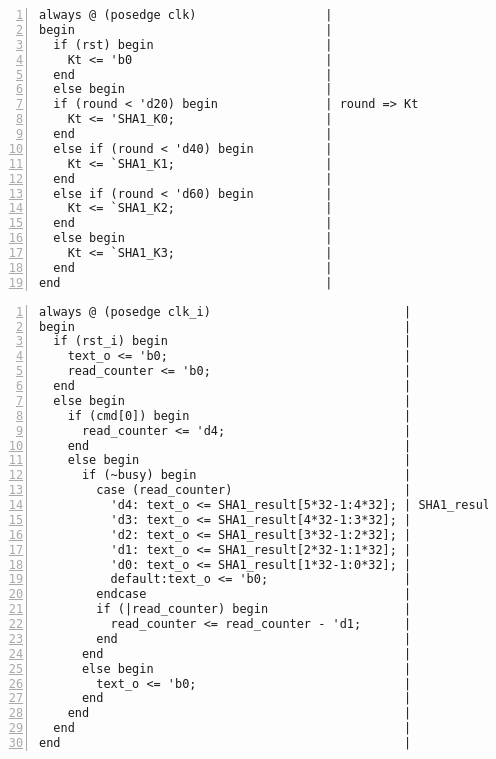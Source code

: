 \begin{Verbatim}[frame=single, numbers=left, tabsize=4, label=Kt generator]
always @ (posedge clk)                  |
begin                                   |
  if (rst) begin                        |
    Kt <= 'b0                           |
  end                                   |
  else begin                            |
  if (round < 'd20) begin               | round => Kt
    Kt <= 'SHA1_K0;                     |
  end                                   |
  else if (round < 'd40) begin          |
    Kt <= `SHA1_K1;                     |
  end                                   |
  else if (round < 'd60) begin          |
    Kt <= `SHA1_K2;                     |
  end                                   |
  else begin                            |
    Kt <= `SHA1_K3;                     |
  end                                   |
end                                     |
\end{Verbatim}


\begin{Verbatim}[frame=single, numbers=left, tabsize=4, label=Read result]
always @ (posedge clk_i)                           |
begin                                              |
  if (rst_i) begin                                 |
    text_o <= 'b0;                                 |
    read_counter <= 'b0;                           |
  end                                              |
  else begin                                       |
    if (cmd[0]) begin                              |
      read_counter <= 'd4;                         |
    end                                            |
    else begin                                     |
      if (~busy) begin                             |
        case (read_counter)                        |
          'd4: text_o <= SHA1_result[5*32-1:4*32]; | SHA1_result => text_o
          'd3: text_o <= SHA1_result[4*32-1:3*32]; |
          'd2: text_o <= SHA1_result[3*32-1:2*32]; |
          'd1: text_o <= SHA1_result[2*32-1:1*32]; |
          'd0: text_o <= SHA1_result[1*32-1:0*32]; |
          default:text_o <= 'b0;                   |
        endcase                                    |
        if (|read_counter) begin                   |
          read_counter <= read_counter - 'd1;      | 
        end                                        |
      end                                          |
      else begin                                   |
        text_o <= 'b0;                             |
      end                                          |
    end                                            |
  end                                              |
end                                                |
\end{Verbatim}
